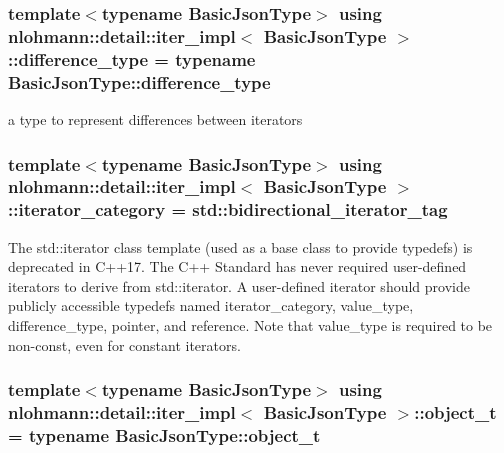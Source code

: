 \subsubsection[{\texorpdfstring{difference\+\_\+type}{difference_type}}]{\setlength{\rightskip}{0pt plus 5cm}template$<$typename Basic\+Json\+Type$>$ using {\bf nlohmann\+::detail\+::iter\+\_\+impl}$<$ {\bf Basic\+Json\+Type} $>$\+::{\bf difference\+\_\+type} =  typename Basic\+Json\+Type\+::difference\+\_\+type}\hypertarget{classnlohmann_1_1detail_1_1iter__impl_a2f7ea9f7022850809c60fc3263775840}{}\label{classnlohmann_1_1detail_1_1iter__impl_a2f7ea9f7022850809c60fc3263775840}


a type to represent differences between iterators 

\subsubsection[{\texorpdfstring{iterator\+\_\+category}{iterator_category}}]{\setlength{\rightskip}{0pt plus 5cm}template$<$typename Basic\+Json\+Type$>$ using {\bf nlohmann\+::detail\+::iter\+\_\+impl}$<$ {\bf Basic\+Json\+Type} $>$\+::{\bf iterator\+\_\+category} =  std\+::bidirectional\+\_\+iterator\+\_\+tag}\hypertarget{classnlohmann_1_1detail_1_1iter__impl_ad9e091f5c70b34b5b1abc1ab15fd9106}{}\label{classnlohmann_1_1detail_1_1iter__impl_ad9e091f5c70b34b5b1abc1ab15fd9106}
The std\+::iterator class template (used as a base class to provide typedefs) is deprecated in C++17. The C++ Standard has never required user-\/defined iterators to derive from std\+::iterator. A user-\/defined iterator should provide publicly accessible typedefs named iterator\+\_\+category, value\+\_\+type, difference\+\_\+type, pointer, and reference. Note that value\+\_\+type is required to be non-\/const, even for constant iterators. 
\subsubsection[{\texorpdfstring{object\+\_\+t}{object_t}}]{\setlength{\rightskip}{0pt plus 5cm}template$<$typename Basic\+Json\+Type$>$ using {\bf nlohmann\+::detail\+::iter\+\_\+impl}$<$ {\bf Basic\+Json\+Type} $>$\+::{\bf object\+\_\+t} =  typename Basic\+Json\+Type\+::object\+\_\+t\hspace{0.3cm}{\ttfamily [private]}}\hypertarget{classnlohmann_1_1detail_1_1iter__impl_ab9a9598052e83fa14a2288e56d5dda7c}{}\label{classnlohmann_1_1detail_1_1iter__impl_ab9a9598052e83fa14a2288e56d5dda7c}

